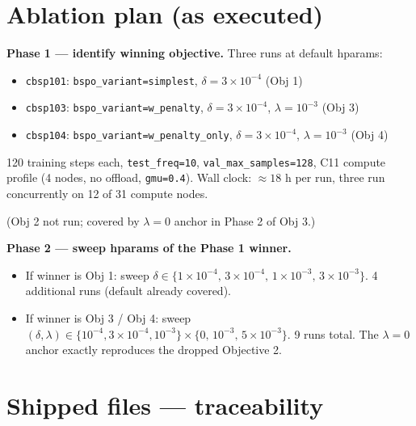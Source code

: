 \documentclass{article}
\begin{document}
\section{Ablation plan (as executed)}

\textbf{Phase 1 --- identify winning objective.} Three runs at default
hparams:
\begin{itemize}
\item \texttt{cbsp101}: \texttt{bspo\_variant=simplest}, $\delta=3 \times 10^{-4}$ (Obj 1)
\item \texttt{cbsp103}: \texttt{bspo\_variant=w\_penalty}, $\delta=3 \times 10^{-4}$, $\lambda=10^{-3}$ (Obj 3)
\item \texttt{cbsp104}: \texttt{bspo\_variant=w\_penalty\_only}, $\delta=3 \times 10^{-4}$, $\lambda=10^{-3}$ (Obj 4)
\end{itemize}

120 training steps each, \texttt{test\_freq=10}, \texttt{val\_max\_samples=128},
C11 compute profile (4 nodes, no offload, \texttt{gmu=0.4}).
Wall clock: $\approx 18$ h per run, three run concurrently on 12 of 31
compute nodes.

(Obj 2 not run; covered by $\lambda=0$ anchor in Phase 2 of Obj 3.)

\textbf{Phase 2 --- sweep hparams of the Phase 1 winner.}

\begin{itemize}
\item If winner is Obj 1: sweep $\delta \in \{1 \times 10^{-4},\, 3 \times 10^{-4},\, 1 \times 10^{-3},\, 3 \times 10^{-3}\}$. 4 additional runs (default already covered).
\item If winner is Obj 3 / Obj 4: sweep
  $(\delta, \lambda) \in \{10^{-4}, 3 \times 10^{-4}, 10^{-3}\} \times \{0,\, 10^{-3},\, 5 \times 10^{-3}\}$.
  9 runs total. The $\lambda = 0$ anchor exactly reproduces the dropped
  Objective 2.
\end{itemize}

\section{Shipped files --- traceability}
\end{document}
